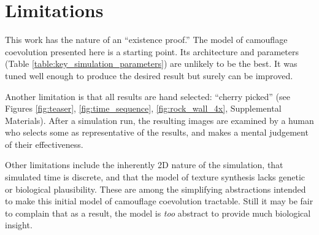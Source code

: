 \documentclass[letterpaper]{article}
\begin{document}

\section{Limitations}
\label{subsec:limitations}
This work has the nature of an “existence proof.” The model of camouflage coevolution presented here is a starting point. Its architecture and parameters (Table \ref{table:key_simulation_parameters}) are unlikely to be the best. It was tuned well enough to produce the desired result but surely can be improved.
\par
Another limitation is that all results are hand selected: “cherry picked” (see Figures \ref{fig:teaser}, \ref{fig:time_sequence}, \ref{fig:rock_wall_4x}, Supplemental Materials). After a simulation run, the resulting images are examined by a human who selects some as representative of the results, and makes a mental judgement of their effectiveness.
\par
Other limitations include the inherently 2D nature of the simulation, that simulated time is discrete, and that the model of texture synthesis lacks genetic or biological plausibility. These are among the simplifying abstractions intended to make this initial model of camouflage coevolution tractable. Still it may be fair to complain that as a result, the model is \textit{too} abstract to provide much biological insight.
\par

\end{document}
